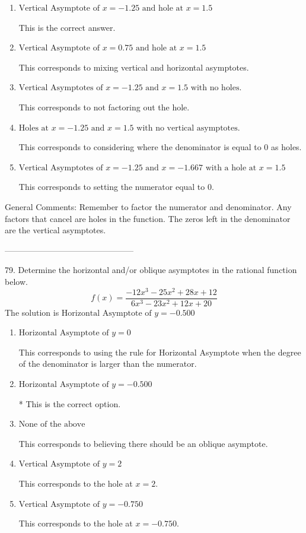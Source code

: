 \documentclass{extbook}[14pt]
\begin{document}
\begin{enumerate}[label=\Alph*.] 
\item $ \text{Vertical Asymptote of } x = -1.25 \text{ and hole at } x = 1.5 $ 

 This is the correct answer. 
\item $ \text{Vertical Asymptote of } x = 0.75 \text{ and hole at } x = 1.5 $ 

 This corresponds to mixing vertical and horizontal asymptotes. 
\item $ \text{Vertical Asymptotes of } x = -1.25 \text{ and } x = 1.5 \text{ with no holes.} $ 

 This corresponds to not factoring out the hole. 
\item $ \text{Holes at } x = -1.25 \text{ and } x = 1.5 \text{ with no vertical asymptotes.} $ 

 This corresponds to considering where the denominator is equal to 0 as holes. 
\item $ \text{Vertical Asymptotes of } x = -1.25 \text{ and } x = -1.667 \text{ with a hole at } x = 1.5 $ 

 This corresponds to setting the numerator equal to 0. 
\end{enumerate} 
 
General Comments: Remember to factor the numerator and denominator. Any factors that cancel are holes in the function. The zeros left in the denominator are the vertical asymptotes.

-----------------------------------------------

79. Determine the horizontal and/or oblique asymptotes in the rational function below.
\[ f(x) = \frac{-12x^{3} -25 x^{2} +28 x + 12}{6x^{3} -23 x^{2} +12 x + 20} \] 
The solution is $ \text{Horizontal Asymptote of } y = -0.500  $ 

\begin{enumerate}[label=\Alph*.] 
\item $ \text{Horizontal Asymptote of } y = 0  $ 

 This corresponds to using the rule for Horizontal Asymptote when the degree of the denominator is larger than the numerator. 
\item $ \text{Horizontal Asymptote of } y = -0.500  $ 

 * This is the correct option. 
\item $ \text{None of the above} $ 

 This corresponds to believing there should be an oblique asymptote. 
\item $ \text{Vertical Asymptote of } y = 2  $ 

 This corresponds to the hole at $x = 2$. 
\item $ \text{Vertical Asymptote of } y = -0.750  $ 

 This corresponds to the hole at $x = -0.750$. 
\end{enumerate} 
 
\end{document}
